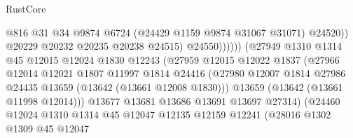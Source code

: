 \begin{lexlean}{RustCore}
\begin{coremodule}
                                              @816
                                              @31
                                              @34
                                              @9874
                                              @6724
                                              (@24429 @1159 @9874 @31067 @31071)
                                              @24520))
                                          @20229
                                          @20232
                                          @20235
                                          @20238
                                          @24515)
                                        @24550))))))
                            (@27949
                              @1310
                              @1314
                              @45
                              @12015
                              @12024
                              @1830
                              @12243
                              (@27959
                                @12015
                                @12022
                                @1837
                                (@27966
                                  @12014
                                  @12021
                                  @1807
                                  @11997
                                  @1814
                                  @24416
                                  (@27980
                                    @12007
                                    @1814
                                    @27986
                                    @24435
                                    @13659
                                    (@13642 (@13661 @12008 @1830)))
                                  @13659
                                  (@13642 (@13661 @11998 @12014)))
                                @13677
                                @13681
                                @13686
                                @13691
                                @13697
                                @27314)
                              (@24460
                                @12024
                                @1310
                                @1314
                                @45
                                @12047
                                @12135
                                @12159
                                @12241
                                (@28016
                                  @1302
                                  @1309
                                  @45
                                  @12047

\end{coremodule}
\end{lexlean}

